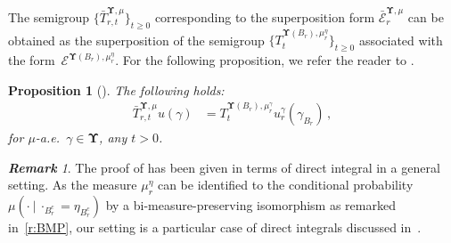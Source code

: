 \documentclass[11pt,letterpaper]{amsart}
\newcommand{\sem}[1]{\{#1\}_{t \ge 0}}
\newcommand{\diff}{\mathop{}\!\mathrm{d}}
\newcommand{\R}{{\mathbb R}}
\newcommand{\comma}{\,\,\mathrm{,}\;\,}
\newcommand{\EE}[2]{\mcE^{#1, #2}}
\newcommand{\purple}[1]{{\color{purple}#1}}
\newcommand{\QP}{{\mu}}
\newcommand{\dUpsilon}{{\mathbf \Upsilon}}
\newcommand{\U}{\dUpsilon}
\newcommand{\E}{\mathcal E}
\renewcommand{\1}{\mathbf 1}
\newcommand{\p}{\pi}
\numberwithin{equation}{section}
\theoremstyle{plain}
\newtheorem{prop}[thm]{Proposition}%
\theoremstyle{definition}
\theoremstyle{remark}
\newtheorem{rem}[thm]{\bf Remark}%
\begin{document}
%
%
%
%
The semigroup $\sem{\bar{T}_{r, t}^{\U, \QP}}$ corresponding to the superposition form $\bar{\E}_r^{\U, \QP}$ can be obtained as the superposition of  the semigroup $\sem{T^{\U(B_r), \QP_r^\eta}_{t}}$ associated with the form~$\E^{\U(B_r), \QP_r^\eta}$. For the following proposition, we refer the reader to %
\cite[(iii) Prop.~2.13]{LzDS20}.
\begin{prop}[{\cite[(iii) Prop.~2.13]{LzDS20}}]\label{prop: 1-1}
The following holds: 
	\begin{align} \label{eq: R-1}
		\bar{T}_{r,t}^{\U, \QP}u(\gamma) & = T^{\U(B_r), \QP_r^\gamma}_{t} u_{r}^{\gamma}(\gamma_{B_r}) \, ,
	\end{align}
	for $\QP$-a.e.\ $\gamma\in \dUpsilon$, any $t>0$.
\end{prop}
\begin{rem}
The proof of \cite[(iii) Prop.~2.13]{LzDS20} has been given in terms of direct integral in a general setting. As the measure $\QP_r^\eta$ can be identified to the conditional probability~$\QP(\cdot\ |\ \cdot_{B_r^c}=\eta_{B_r^c})$ by a bi-measure-preserving isomorphism as remarked in~\eqref{r:BMP}, our setting is a particular case of direct integrals discussed in~\cite{LzDS20}.
\end{rem}
\end{document}
